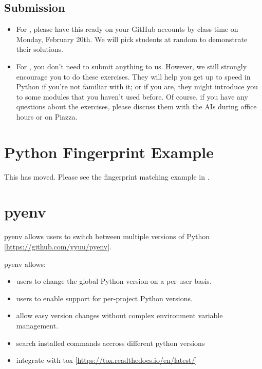 \subsection{Submission}
\label{\detokenize{i524/python-homework:submission}}\begin{itemize}
\item {} 
For , please have this ready on your GitHub
accounts by class time on Monday, February 20th. We will pick
students at random to demonstrate their solutions.

\item {} 
For , you don't need to submit anything to
us. However, we still strongly encourage you to do these
exercises. They will help you get up to speed in Python if you're
not familiar with it; or if you are, they might introduce you to
some modules that you haven't used before. Of course, if you have
any questions about the exercises, please discuss them with the AIs
during office hours or on Piazza.

\end{itemize}


\section{Python Fingerprint Example}
\label{\detokenize{lesson/prg/python_lesson1::doc}}\label{\detokenize{lesson/prg/python_lesson1:python-fingerprint-example}}
This has moved.
Please see the fingerprint matching example in .


\section{pyenv}
\label{\detokenize{lesson/prg/pyenv::doc}}\label{\detokenize{lesson/prg/pyenv:pyenv}}
pyenv allows users to switch between multiple versions of Python
{[}\url{https://github.com/yyuu/pyenv}{]}.

pyenv allows:
\begin{itemize}
\item {} 
users to  change the global Python version on a per-user basis.

\item {} 
users to enable support for per-project Python versions.

\item {} 
allow easy version changes without complex environment variable
management.

\item {} 
search installed commands accross different python versions

\item {} 
integrate with tox {[}\url{https://tox.readthedocs.io/en/latest/}{]}

\end{itemize}


